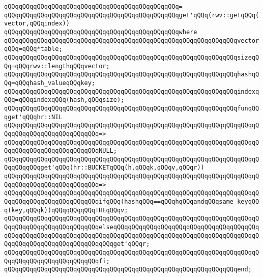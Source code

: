 \verb|qQQqqQQqqQQqqQQqqQQqqQQqqQQqqQQqqQQqqQQqqQQqqQQq=|\newline
\verb|qQQqqQQqqQQqqQQqqQQqqQQqqQQqqQQqqQQqqQQqqQQqqQQqget'qQQq(rwv::getqQQq(vector,qQQqindex))|\newline
\verb|qQQqqQQqqQQqqQQqqQQqqQQqqQQqqQQqqQQqqQQqqQQqqQQqwhere|\newline
\newline
\verb|qQQqqQQqqQQqqQQqqQQqqQQqqQQqqQQqqQQqqQQqqQQqqQQqqQQqqQQqqQQqqQQqvectorqQQq=qQQq*table;|\newline
\verb|qQQqqQQqqQQqqQQqqQQqqQQqqQQqqQQqqQQqqQQqqQQqqQQqqQQqqQQqqQQqqQQqsizeqQQq=qQQqrwv::lengthqQQqvector;|\newline
\verb|qQQqqQQqqQQqqQQqqQQqqQQqqQQqqQQqqQQqqQQqqQQqqQQqqQQqqQQqqQQqqQQqhashqQQq=qQQqhash_valueqQQqkey;|\newline
\verb|qQQqqQQqqQQqqQQqqQQqqQQqqQQqqQQqqQQqqQQqqQQqqQQqqQQqqQQqqQQqqQQqindexqQQq=qQQqindexqQQq(hash,qQQqsize);|\newline
\newline
\verb|qQQqqQQqqQQqqQQqqQQqqQQqqQQqqQQqqQQqqQQqqQQqqQQqqQQqqQQqqQQqqQQqfunqQQqget'qQQqhr::NIL|\newline
\verb|qQQqqQQqqQQqqQQqqQQqqQQqqQQqqQQqqQQqqQQqqQQqqQQqqQQqqQQqqQQqqQQqqQQqqQQqqQQqqQQqqQQqqQQqqQQqqQQq=>|\newline
\verb|qQQqqQQqqQQqqQQqqQQqqQQqqQQqqQQqqQQqqQQqqQQqqQQqqQQqqQQqqQQqqQQqqQQqqQQqqQQqqQQqqQQqqQQqqQQqqQQqNULL;|\newline
\newline
\verb|qQQqqQQqqQQqqQQqqQQqqQQqqQQqqQQqqQQqqQQqqQQqqQQqqQQqqQQqqQQqqQQqqQQqqQQqqQQqqQQqget'qQQq(hr::BUCKETqQQq(h,qQQqk,qQQqv,qQQqr))|\newline
\verb|qQQqqQQqqQQqqQQqqQQqqQQqqQQqqQQqqQQqqQQqqQQqqQQqqQQqqQQqqQQqqQQqqQQqqQQqqQQqqQQqqQQqqQQqqQQqqQQq=>|\newline
\verb|qQQqqQQqqQQqqQQqqQQqqQQqqQQqqQQqqQQqqQQqqQQqqQQqqQQqqQQqqQQqqQQqqQQqqQQqqQQqqQQqqQQqqQQqqQQqqQQqifqQQq(hashqQQq==qQQqhqQQqandqQQqsame_keyqQQq(key,qQQqk))qQQqqQQqqQQqTHEqQQqv;|\newline
\verb|qQQqqQQqqQQqqQQqqQQqqQQqqQQqqQQqqQQqqQQqqQQqqQQqqQQqqQQqqQQqqQQqqQQqqQQqqQQqqQQqqQQqqQQqqQQqqQQqelseqQQqqQQqqQQqqQQqqQQqqQQqqQQqqQQqqQQqqQQqqQQqqQQqqQQqqQQqqQQqqQQqqQQqqQQqqQQqqQQqqQQqqQQqqQQqqQQqqQQqqQQqqQQqqQQqqQQqqQQqqQQqqQQqqQQqqQQqqQQqget'qQQqr;|\newline
\verb|qQQqqQQqqQQqqQQqqQQqqQQqqQQqqQQqqQQqqQQqqQQqqQQqqQQqqQQqqQQqqQQqqQQqqQQqqQQqqQQqqQQqqQQqqQQqqQQqfi;|\newline
\verb|qQQqqQQqqQQqqQQqqQQqqQQqqQQqqQQqqQQqqQQqqQQqqQQqqQQqqQQqqQQqqQQqend;|\newline
